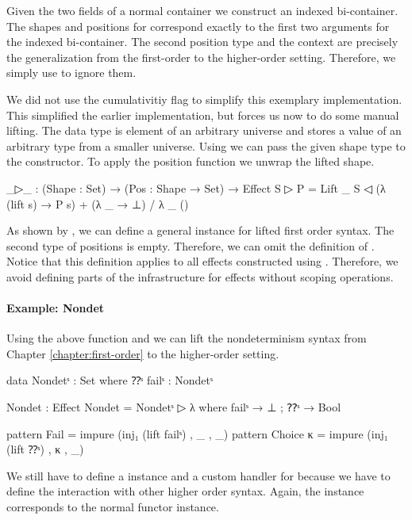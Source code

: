 Given the two fields of a normal container we construct an indexed bi-container.
The shapes and positions for  correspond exactly to the first
two arguments for the indexed bi-container.
The second position type and the context are precisely the generalization from
the first-order to the higher-order setting.
Therefore, we simply use  to ignore them.

We did not use the cumulativitiy flag to simplify this exemplary implementation.
This simplified the earlier implementation, but forces us now to do some manual
lifting.
The  data type is element of an arbitrary universe and stores
a value of an arbitrary type from a smaller universe.
Using  we can pass the given shape type to the constructor.
To apply the position function we unwrap the lifted shape.

\begin{code}
_▷_ : (Shape : Set) → (Pos : Shape → Set) → Effect
S ▷ P = Lift _ S ◁ (λ (lift s) → P s) + (λ _ → ⊥) / λ _ ()
\end{code}
As shown by \textcite{DBLP:conf/haskell/WuSH14}, we can define a general
 instance for lifted first order syntax.
The second type of positions is empty.
Therefore, we can omit the definition of .
Notice that this definition applies to all effects constructed using
.
Therefore, we avoid defining parts of the infrastructure for effects without
scoping operations.


\paragraph{Example: Nondet}
Using the above function and  we can lift the
nondeterminism syntax from Chapter \ref{chapter:first-order} to the higher-order
setting.

\begin{code}[hide]
data Nondetˢ : Set where ⁇ˢ failˢ : Nondetˢ
\end{code}
\begin{code}
Nondet : Effect
Nondet = Nondetˢ ▷ λ where failˢ → ⊥ ; ⁇ˢ → Bool

pattern Fail      = impure (inj₁ (lift failˢ)  , _ , _)
pattern Choice κ  = impure (inj₁ (lift ⁇ˢ)     , κ , _)
\end{code}
We still have to define a  instance and a custom handler
for  because we have to define the interaction with other
higher order syntax.
Again, the  instance corresponds to the normal functor
instance.


